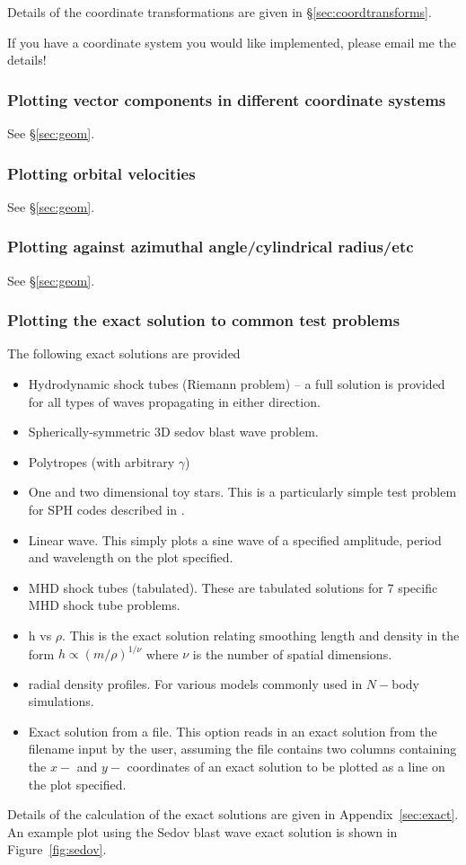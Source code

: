 \documentclass[a4paper,11pt]{article}
\begin{document}
 Details of the coordinate transformations are given in \S\ref{sec:coordtransforms}.

 If you have a coordinate system you would like implemented, please email me the details!

\subsubsection{ Plotting vector components in different coordinate systems}
See \S\ref{sec:geom}.

\subsubsection{ Plotting orbital velocities}
See \S\ref{sec:geom}.

\subsubsection{ Plotting against azimuthal angle/cylindrical radius/etc}
See \S\ref{sec:geom}.

\subsubsection{ Plotting the exact solution to common test problems}
\label{sec:exactsolns}
 The following exact solutions are provided
\begin{itemize}
\item Hydrodynamic shock tubes (Riemann problem) -- a full solution is provided for all types of waves propagating in either direction.
\item Spherically-symmetric 3D sedov blast wave problem.
\item Polytropes (with arbitrary $\gamma$)
\item One and two dimensional toy stars. This is a particularly simple test
problem for SPH codes described in \citet{mp04}.
\item Linear wave. This simply plots a sine wave of a specified amplitude, period and
wavelength on the plot specified.
\item MHD shock tubes (tabulated). These are tabulated solutions for 7 specific MHD
shock tube problems.
\item h vs $\rho$. This is the exact solution relating smoothing length and density in
the form $h \propto (m/\rho)^{1/\nu}$ where $\nu$ is the number of spatial dimensions.
\item radial density profiles. For various models commonly used in $N-$body simulations.
\item Exact solution from a file. This option reads in an exact solution from the
filename input by the user, assuming the file contains two columns containing the $x-$ and $y-$ coordinates of
an exact solution to be plotted as a line on the plot specified.
\end{itemize}
Details of the calculation of the exact solutions are given in Appendix~\ref{sec:exact}. An example plot using the Sedov blast wave exact solution is shown in Figure~\ref{fig:sedov}.
\end{document}
